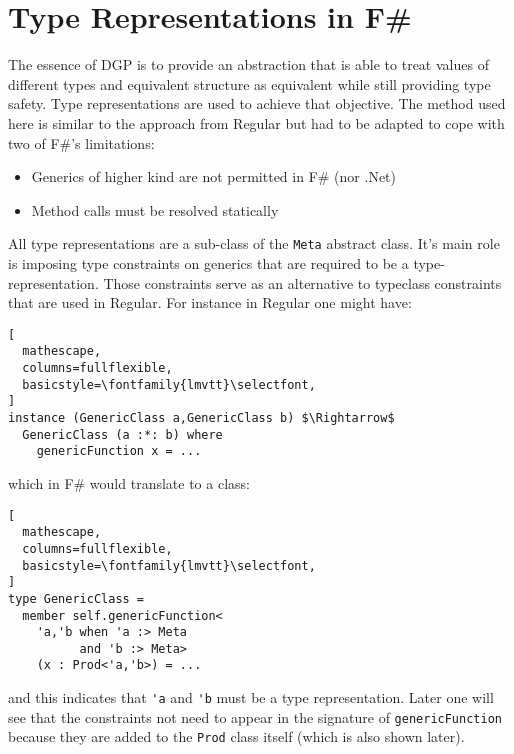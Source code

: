 \documentclass{sigplanconf}
\begin{document}
\section{Type Representations in F\#}
The essence of DGP is to provide an abstraction that is able to treat values of different types and equivalent structure as equivalent while still providing type safety. Type representations are used to achieve that objective. The method used here is similar to the approach from Regular\cite{Regular} but had to be adapted to cope with two of F\#'s limitations:
\begin{itemize}
\item Generics of higher kind are not permitted in F\# (nor .Net)
\item Method calls must be resolved statically
\end{itemize}
All type representations are a sub-class of the \verb+Meta+ abstract class. It's main role is imposing type constraints on generics that are required to be a type-representation. Those constraints serve as an alternative to typeclass constraints that are used in Regular. For instance in Regular one might have:
\begin{lstlisting}[
  mathescape,
  columns=fullflexible,
  basicstyle=\fontfamily{lmvtt}\selectfont,
]
instance (GenericClass a,GenericClass b) $\Rightarrow$
  GenericClass (a :*: b) where
    genericFunction x = ...
\end{lstlisting}
which in F\# would translate to a class:
\begin{lstlisting}[
  mathescape,
  columns=fullflexible,
  basicstyle=\fontfamily{lmvtt}\selectfont,
]
type GenericClass =
  member self.genericFunction<
    'a,'b when 'a :> Meta 
          and 'b :> Meta> 
    (x : Prod<'a,'b>) = ...
\end{lstlisting}
and this indicates that \verb+'a+ and \verb+'b+ must be a type representation. Later one will see that the constraints not need to appear in the signature of \verb+genericFunction+ because they are added to the \verb+Prod+ class itself (which is also shown later).
\end{document}
